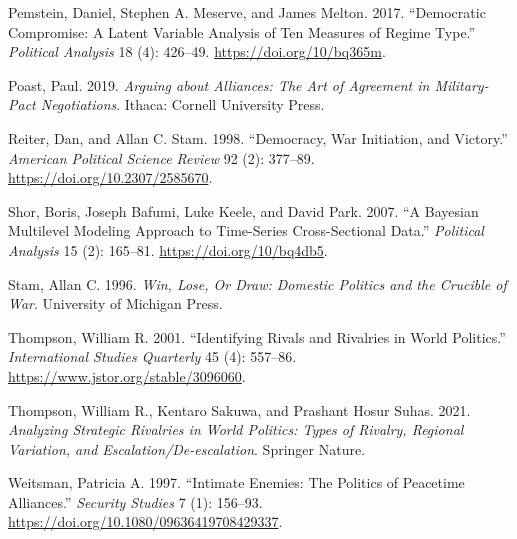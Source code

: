 \documentclass[
  letterpaper,
  DIV=11,
  numbers=noendperiod]{scrartcl}
\newlength{\cslhangindent}
\newenvironment{CSLReferences}[2] %
 {\begin{list}{}{%
  \setlength{\itemindent}{0pt}
  \setlength{\leftmargin}{0pt}
  \setlength{\parsep}{0pt}
  \ifodd #1
   \setlength{\leftmargin}{\cslhangindent}
   \setlength{\itemindent}{-1\cslhangindent}
  \fi
  \setlength{\itemsep}{#2\baselineskip}}}
 {\end{list}}
\begin{document}
\begin{CSLReferences}{1}{0}
Pemstein, Daniel, Stephen A. Meserve, and James Melton. 2017.
{``Democratic {Compromise}: {A Latent Variable Analysis} of {Ten
Measures} of {Regime Type}.''} \emph{Political Analysis} 18 (4):
426--49. \url{https://doi.org/10/bq365m}.

Poast, Paul. 2019. \emph{Arguing about {Alliances}: {The Art} of
{Agreement} in {Military-Pact Negotiations}}. Ithaca: Cornell University
Press.

Reiter, Dan, and Allan C. Stam. 1998. {``Democracy, {War Initiation},
and {Victory}.''} \emph{American Political Science Review} 92 (2):
377--89. \url{https://doi.org/10.2307/2585670}.

Shor, Boris, Joseph Bafumi, Luke Keele, and David Park. 2007. {``A
{Bayesian Multilevel Modeling Approach} to {Time-Series Cross-Sectional
Data}.''} \emph{Political Analysis} 15 (2): 165--81.
\url{https://doi.org/10/bq4db5}.

Stam, Allan C. 1996. \emph{Win, {Lose}, {Or Draw}: {Domestic Politics}
and the {Crucible} of {War}}. University of Michigan Press.

Thompson, William R. 2001. {``Identifying {Rivals} and {Rivalries} in
{World Politics}.''} \emph{International Studies Quarterly} 45 (4):
557--86. \url{https://www.jstor.org/stable/3096060}.

Thompson, William R., Kentaro Sakuwa, and Prashant Hosur Suhas. 2021.
\emph{Analyzing {Strategic Rivalries} in {World Politics}: {Types} of
{Rivalry}, {Regional Variation}, and {Escalation}/{De-escalation}}.
Springer Nature.

Weitsman, Patricia A. 1997. {``Intimate Enemies: {The} Politics of
Peacetime Alliances.''} \emph{Security Studies} 7 (1): 156--93.
\url{https://doi.org/10.1080/09636419708429337}.

\end{CSLReferences}
\end{document}
